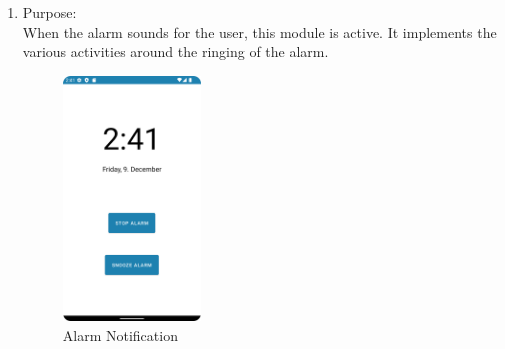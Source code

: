 \documentclass[conference]{IEEEtran}
\begin{document}
\begin{enumerate}
    \item Purpose: \\
    When the alarm sounds for the user, this module is active. It implements the various activities around the ringing of the alarm.\\ 
    
    \begin{figure}[htbp]
        \centerline{\includegraphics[height=65mm,scale=0.5]{Images/App_AlarmRinging.png}}
        \caption{Alarm Notification}
        \label{fig}
    \end{figure}
    

\end{enumerate}
\end{document}
